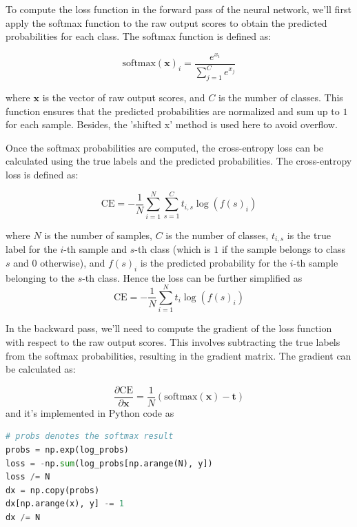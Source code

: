 \documentclass[10pt,a4paper,twoside]{tau}
\renewcommand{\vec}[1]{\mathbf{#1}}
\begin{document}
To compute the loss function in the forward pass of the neural network, we'll first apply the softmax function to the raw output scores to obtain the predicted probabilities for each class. The softmax function is defined as:

\begin{equation}
\text{softmax}(\vec{x})_i = \frac{e^{x_i}}{\sum_{j=1}^{C} e^{x_j}} \tag{3.3.2}
\end{equation}

where $\vec{x}$ is the vector of raw output scores, and $C$ is the number of classes. This function ensures that the predicted probabilities are normalized and sum up to $1$ for each sample. Besides, the 'shifted x' method is used here to avoid overflow.

Once the softmax probabilities are computed, the cross-entropy loss can be calculated using the true labels and the predicted probabilities. The cross-entropy loss is defined as:

\begin{equation}
\text{CE} = -\frac{1}{N} \sum_{i=1}^{N} \sum_{s=1}^{C} t_{i,s} \log(f(s)_i) \tag{3.3.3}
\end{equation}

where $N$ is the number of samples, $C$ is the number of classes, $t_{i,s}$ is the true label for the $i$-th sample and $s$-th class (which is $1$ if the sample belongs to class $s$ and $0$ otherwise), and $f(s)_i$ is the predicted probability for the $i$-th sample belonging to the $s$-th class. Hence the loss can be further simplified as
\begin{equation}
    \text{CE} = -\frac{1}{N} \sum_{i=1}^{N} t_i \log(f(s)_i) \tag{3.3.4}
\end{equation}

In the backward pass, we'll need to compute the gradient of the loss function with respect to the raw output scores. This involves subtracting the true labels from the softmax probabilities, resulting in the gradient matrix. The gradient can be calculated as:

\begin{equation}
\frac{\partial \text{CE}}{\partial \mathbf{x}} = \frac{1}{N} (\text{softmax}(\mathbf{x}) - \mathbf{t}) \tag{3.3.5}
\end{equation}
and it's implemented in Python code as
\begin{center}
\begin{lstlisting}[language=Python,
        stringstyle=\color{green},
        numbers=none,
        keywordstyle=\color{purple},
        keywords={np, arange, sum, copy, exp}
    ]
# probs denotes the softmax result
probs = np.exp(log_probs)
loss = -np.sum(log_probs[np.arange(N), y])
loss /= N
dx = np.copy(probs)
dx[np.arange(x), y] -= 1
dx /= N
\end{lstlisting}   
\end{center}
\end{document}
